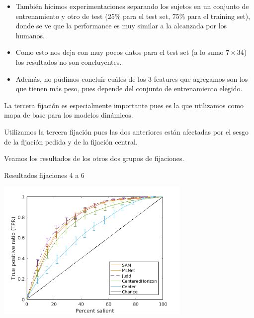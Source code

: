 \documentclass[compress]{beamer}
\begin{document}
\begin{frame}
\begin{itemize}
\item También hicimos experimentaciones separando los sujetos en un conjunto de entrenamiento y otro de test (25\% para el test set, 75\% para el training set), donde se ve que la performance es muy similar a la alcanzada por los humanos.
\item Como esto nos deja con muy pocos datos para el test set (a lo sumo $7 \times 34$) los resultados no son concluyentes.
\item Además, no pudimos concluir cuáles de los 3 features que agregamos son los que tienen más peso, pues depende del conjunto de entrenamiento elegido.
\end{itemize}
\end{frame}

\begin{frame}

La tercera fijación es especialmente importante pues es la que utilizamos como mapa de base para los modelos dinámicos.

\bigskip

Utilizamos la tercera fijación pues las dos anteriores están afectadas por el sesgo de la fijación pedida y de la fijación central.

\bigskip

Veamos los resultados de los otros dos grupos de fijaciones.
\end{frame}

\begin{frame}{Resultados fijaciones 4 a 6}
\begin{center}
\includegraphics[width=0.7\textwidth]{images/results_fix_4_to_6_all.png} 
\end{center}
\end{frame}
\end{document}
